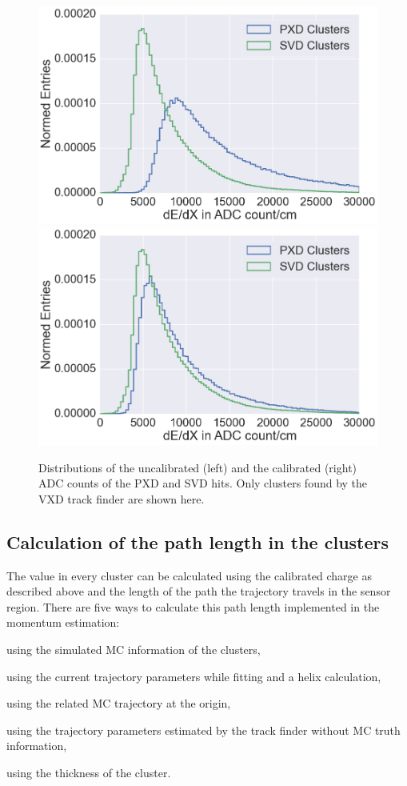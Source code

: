 \begin{figure}
  \centering
 \includegraphics[width=0.48\linewidth]{figures/vxd/dEdXUncalibrated.png}
 \includegraphics[width=0.48\linewidth]{figures/vxd/dEdXCalibrated.png}
 \caption{Distributions of the uncalibrated (left) and the calibrated (right) ADC counts of the PXD and SVD hits. Only clusters found by the VXD track finder are shown here.}
 \label{fig-adc-count}
\end{figure}




\subsection{Calculation of the path length in the clusters}
The \dedx value in every cluster can be calculated using the calibrated charge as described above and the length of the path the trajectory travels in the sensor region. There are five ways to calculate this path length implemented in the momentum estimation:
\begin{zlist}
 \item using the simulated MC information of the clusters,
 \item using the current trajectory parameters while fitting and a helix calculation,
 \item using the related MC trajectory at the origin,
 \item using the trajectory parameters estimated by the track finder without MC truth information,
 \item using the thickness of the cluster.
\end{zlist}

